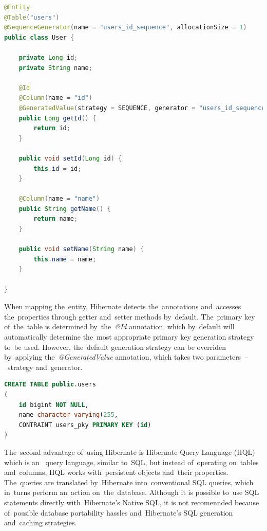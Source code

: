 \vspace{1mm}
\begin{lstlisting}[caption=POJO class that features the~advantages of~ORM.,
style=dp-default, language=Java, label=lst-table]
@Entity
@Table("users")
@SequenceGenerator(name = "users_id_sequence", allocationSize = 1)
public class User {

	private Long id;
	private String name;
	
	@Id
	@Column(name = "id")
	@GeneratedValue(strategy = SEQUENCE, generator = "users_id_sequence")
	public Long getId() {
		return id;
	}
	
	public void setId(Long id) {
		this.id = id;
	}
	
	@Column(name = "name")
	public String getName() {
		return name;
	}
	
	public void setName(String name) {
		this.name = name;
	}

}
\end{lstlisting}

When mapping the~entity, Hibernate detects the~annotations and~accesses
the~properties through getter and~setter methods by~default. The~primary key
of~the~table is determined by~the~\textit{@Id} annotation, which by~default will
automatically determine the~most appropriate primary key generation strategy
to~be used. However, the~default generation strategy can be overriden
by~applying the~\textit{@GeneratedValue} annotation, which takes two
parameters~--~strategy and~generator.

\vspace{1mm}
\begin{lstlisting}[caption=The~SQL code that is generated by~Hibernate when
mapping the~entity from~the~listing~\ref{lst-table}., style=dp-default,
language=SQL, label=lst-table-sql]
CREATE TABLE public.users
(
	id bigint NOT NULL,
	name character varying(255,
	CONTRAINT users_pky PRIMARY KEY (id)
)
\end{lstlisting}

The~second advantage of~using Hibernate is Hibernate Query Language (HQL) which
is an~ query language, similar to~SQL, but instead
of~operating on~tables and~columns, HQL works with~persistent objects and~their
properties. The~queries are translated by~Hibernate into~conventional SQL
queries, which in~turns perform an~action on~the~database. Although it is
possible to~use SQL statements directly with~Hibernate's Native SQL, it is not
recomennded because of~possible database portability hassles and~Hibernate's SQL
generation and~caching strategies.

